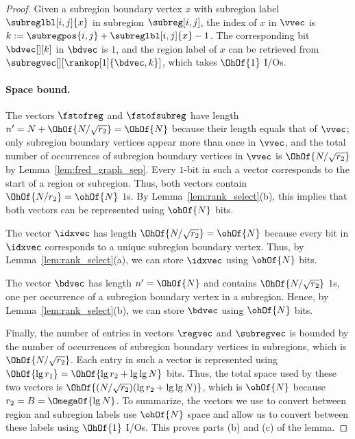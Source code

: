{\begin{proof}
  Given a subregion boundary vertex $x$ with subregion label
  $\subreglbl[i,j]{x}$ in subregion $\subreg[i,j]$, the index of $x$ in
  $\vvec$ is $k := \subregpos{i,j} + \subreglbl[i,j]{x} - 1$.
  The corresponding bit $\bdvec[][k]$ in $\bdvec$ is $1$, and the
  region label of $x$ can be retrieved from
  $\subregvec[][\rankop[1]{\bdvec,k}]$, which takes $\OhOf{1}$ I/Os.

  \paragraph{Space bound.}

  The vectors $\fstofreg$ and $\fstofsubreg$ have length
  $n' = N + \OhOf{N / \sqrt{\subregsz}} = \OhOf{N}$ because their length
  equals that of $\vvec$; only subregion boundary vertices appear more
  than once in $\vvec$, and the total number of occurrences of subregion
  boundary vertices in $\vvec$ is $\OhOf{N / \sqrt{\subregsz}}$ by
  Lemma~\ref{lem:fred_graph_sep}.
  Every $1$-bit in such a vector corresponds to the start of a region
  or subregion.
  Thus, both vectors contain $\OhOf{N / \subregsz} = \ohOf{N}$ $1$s.
  By Lemma~\ref{lem:rank_select}(b), this implies that both vectors can
  be represented using $\ohOf{N}$ bits.

  The vector $\idxvec$ has length $\OhOf{N / \sqrt{\subregsz}} = \ohOf{N}$
  because every bit in $\idxvec$ corresponds to a unique subregion boundary
  vertex.
  Thus, by Lemma~\ref{lem:rank_select}(a), we can store $\idxvec$ using
  $\ohOf{N}$ bits.

  The vector $\bdvec$ has length $n' = \OhOf{N}$ and contains
  $\OhOf{N / \sqrt{\subregsz}}$ $1$s, one per occurrence of a subregion boundary
  vertex in a subregion.
  Hence, by Lemma~\ref{lem:rank_select}(b), we can store $\bdvec$ using
  $\ohOf{N}$ bits.

  Finally, the number of entries in vectors $\regvec$ and $\subregvec$ is
  bounded by the number of occurrences of subregion boundary vertices in
  subregions, which is $\OhOf{N / \sqrt{\subregsz}}$.
  Each entry in such a vector is represented using
  $\OhOf{\lg \regsz} = \OhOf{\lg\subregsz + \lg \lg N}$ bits.
  Thus, the total space used by these two vectors is
  $\OhOf{(N / \sqrt{\subregsz})(\lg \subregsz + \lg \lg N)}$,
  which is $\ohOf{N}$ because $\subregsz = B = \OmegaOf{\lg N}$.
  To summarize, the vectors we use to convert between region and subregion
  labels use $\ohOf{N}$ space and allow us to convert between these labels
  using $\OhOf{1}$ I/Os.
  This proves parts (b) and (c) of the lemma.


\end{proof}}

